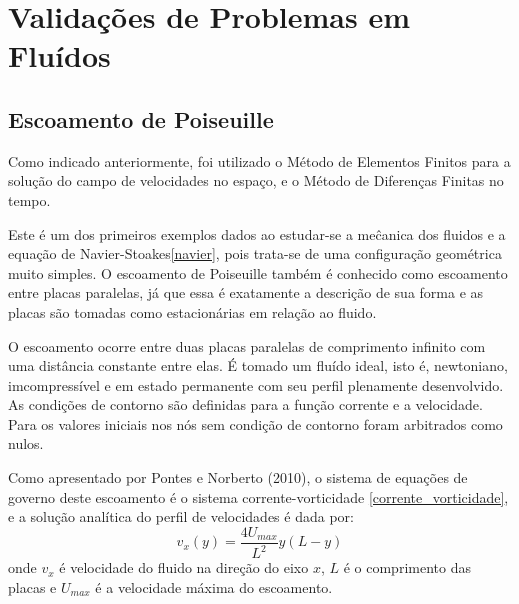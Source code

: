 \section{\textbf{Validações de Problemas em Fluídos}}
\label{sec_fluidos}
\subsection{\textbf{Escoamento de Poiseuille}}
\label{sec_poiseuille}
Como indicado anteriormente, foi utilizado o Método de Elementos Finitos para a solução do campo de velocidades no espaço, e o Método de Diferenças Finitas no tempo.

Este é um dos primeiros exemplos dados ao estudar-se a meĉanica dos fluidos e a equação de Navier-Stoakes\eqref{navier}, pois trata-se de uma configuração geométrica muito simples.
O escoamento de Poiseuille também é conhecido como escoamento entre placas paralelas, já que essa é exatamente a descrição de sua forma e as placas são tomadas como estacionárias em relação ao fluido.

O escoamento ocorre entre duas placas paralelas de comprimento infinito com uma distância constante entre elas.
É tomado um fluído ideal, isto é, newtoniano, imcompressível e em estado permanente com seu perfil plenamente desenvolvido.
As condições de contorno são definidas para a função corrente e a velocidade.
Para os valores iniciais nos nós sem condição de contorno foram arbitrados como nulos.

Como apresentado por Pontes e Norberto (2010)\cite{pontes_norberto}, o sistema de equações de governo deste escoamento é o sistema corrente-vorticidade \ref{corrente_vorticidade}, e a solução analítica do perfil de velocidades é dada por:
\begin{equation}
    v_x(y) = \dfrac{4U_{max}}{L^2}y(L-y)
    \label{poiseuille_sol} 
\end{equation}
onde $v_x$ é velocidade do fluido na direção do eixo $x$, $L$ é o comprimento das placas e $U_{max}$ é a velocidade máxima do escoamento.

